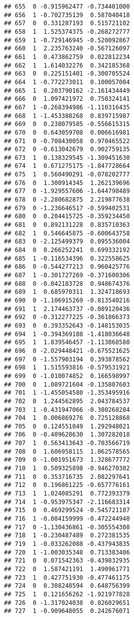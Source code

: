 \documentclass[
]{article}
\begin{document}
\begin{verbatim}
## 655  0 -0.915962477 -0.734401000
## 656  1 -0.702735139  0.587040418
## 657  0  0.331287193  0.515721102
## 658  1  1.525374375 -0.268272777
## 659  1 -0.729146945 -0.520092867
## 660  1  2.235763240 -0.567126097
## 661  1  0.473862759  0.022812234
## 662  1  1.614032276  0.342185368
## 663  0  0.225151401 -0.300705524
## 664  1 -0.772273011  0.100057004
## 665  1  0.203790162 -2.161434449
## 666  0  1.097421972  0.750324141
## 667  1 -0.268394986 -1.110316435
## 668  1 -1.453388268  0.839715987
## 669  0  0.238079585 -0.556615315
## 670  0  0.643059708  0.006616981
## 671  0 -0.708430058  0.970465522
## 672  0 -0.613042679  0.902759135
## 673  1  0.138329545 -1.309451630
## 674  1  0.671275175 -1.847728664
## 675  1  0.560490291 -0.078202777
## 676  0  1.300914345  1.262139696
## 677  0 -1.929557606 -1.644798489
## 678  0 -2.280682875  2.219877638
## 679  0 -1.236646517 -0.599402531
## 680  0  0.204415725 -0.359234450
## 681  0  0.892131228  0.835710363
## 682  1  0.546645875 -0.600643758
## 683  0 -2.125499379  0.095536004
## 684  0  0.266252241  0.699332192
## 685  1 -0.116534396  0.322558625
## 686  0 -0.544277213  0.960425776
## 687  1 -0.301727269 -0.371600306
## 688  0 -0.042183728  0.948674376
## 689  1  0.685970311  1.324718693
## 690  0 -1.106915269 -0.813540216
## 691  1  2.174463737 -0.089120436
## 692  0 -0.312277225 -0.361866373
## 693  0  0.393352643 -0.148153035
## 694  1 -0.394369188 -1.418036648
## 695  1  1.839546457 -1.113868580
## 696  0 -2.029448421 -0.675521625
## 697  0 -1.557903194  0.393878562
## 698  1  1.515593816 -0.579531921
## 699  0 -1.010074852  0.166598997
## 700  0  1.089721604 -0.135807603
## 701  1 -1.455054580 -1.353495916
## 702  0  1.244562895  2.043784537
## 703  1 -0.431947066 -0.380268284
## 704  1  0.006869276  0.725128868
## 705  0  0.124551049  1.292948021
## 706  0 -0.409628630  1.307282018
## 707  1  0.563413643 -0.703566719
## 708  0  1.606958115  1.062578565
## 709  0 -1.001951673  1.328677772
## 710  1  0.509325898 -0.946270302
## 711  0  0.353716735  2.082297641
## 712  0  0.196861225 -0.657776161
## 713  1  1.024085291  0.772393379
## 714  1 -0.953975347 -2.116683314
## 715  0  0.469299524 -0.545721107
## 716  1 -0.084159999 -0.472244940
## 717  0 -1.130436861 -0.305554308
## 718  1 -0.230487489  0.272381535
## 719  1 -0.033262088 -0.437943835
## 720  1 -1.003035348  0.713383406
## 721  0  0.071542363 -0.439832935
## 722  0  1.587421191  1.490961771
## 723  1  0.427751930 -0.477461175
## 724  0  0.308248594  0.648756399
## 725  1  0.121656262 -1.921977828
## 726  0 -1.317024038  0.826029651
## 727  1 -0.909648055  0.242676071

\end{verbatim}
\end{document}

